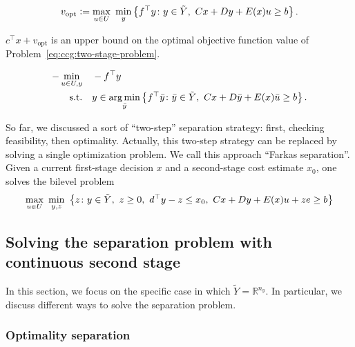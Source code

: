 \begin{equation}
    v_\text{opt} \mathrel{{\mathop:}{=}}
    \max_{u\in U} \ \min_{y} \left\{ f^\top y \colon
        y\in\tilde{Y}, \ Cx + Dy + E(x)u \ge b
    \right\}.
\end{equation}

$c^\top x + v_\text{opt}$ is an upper bound on the optimal objective function
value of Problem~\eqref{eq:ccg:two-stage-problem}.

\begin{subequations}
    \begin{align*}
        - \min_{u\in U,y} \quad & -f^\top y \\
        \text{s.t.} \quad & y \in \operatorname*{arg\,min}_{\bar{y}} \left\{ f^\top \bar{y} \colon
            \bar{y}\in\tilde{Y}, \ Cx + D\bar{y} + E(x)\bar{u} \ge b
        \right\}.
    \end{align*}
\end{subequations}

So far, we discussed a sort of ``two-step'' separation strategy: first,
checking feasibility, then optimality. Actually, this two-step strategy can be
replaced by solving a single optimization problem. We call this approach
``Farkas separation''. Given a current first-stage decision $x$ and a
second-stage cost estimate $x_0$, one solves the bilevel problem 
\begin{equation*}
    \max_{u\in U} \ \min_{y,z} \ \left\{ z \colon y\in\tilde{Y}, \ z \ge 0, \ d^\top y - z \le x_0, \ Cx + Dy + E(x)u + ze \ge b \right\}
\end{equation*}


\begin{remark}
\end{remark}

\subsection{Solving the separation problem with continuous second stage}

In this section, we focus on the specific case in which $\tilde{Y} =
\mathbb{R}^{n_y}$. In particular, we discuss different ways to solve the
separation problem. 

\subsubsection{Optimality separation}


